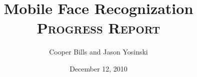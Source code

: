 \documentclass[11pt,letterpaper]{article}
\title{Mobile Face Recognization\\
\textsc{\normalsize Progress Report}}
\author{Cooper Bills and Jason Yosinski \\
\code{\{csb88,jy495\}@cornell.edu}}
\date{December 12, 2010}
\begin{document}
\maketitle

\begin{abstract}

\end{abstract}




\end{document}
